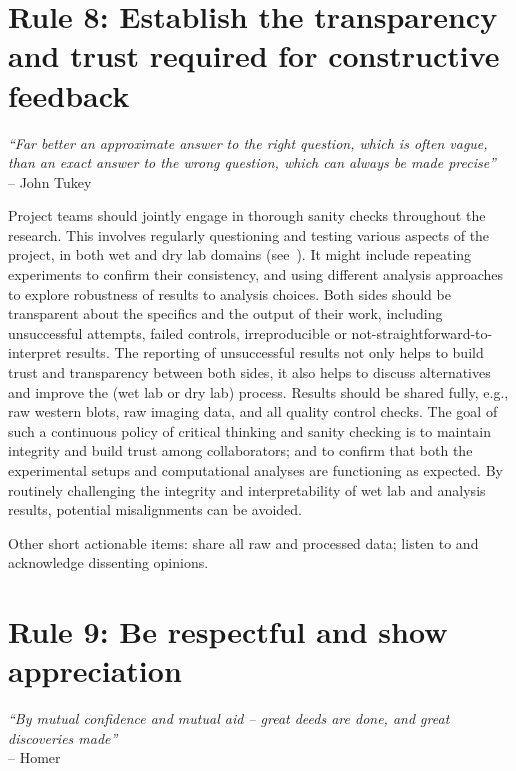 \documentclass{article}
\begin{document}
\section*{Rule 8: Establish the transparency and trust required for constructive feedback} %
\label{rule8_trust}

\begin{flushright}
\rightskip=1cm\textit{``Far better an approximate answer to the right question, which is often vague, than an exact answer to the wrong question, which can always be made precise''} \\
\vspace{.2em}
\rightskip=0cm -- John Tukey
\end{flushright}

Project teams should jointly engage in thorough sanity checks throughout the research. This involves regularly questioning and testing various aspects of the project, in both wet and dry lab domains (see~). It might include repeating experiments to confirm their consistency, and using different analysis approaches to explore robustness of results to analysis choices. Both sides should be transparent about the specifics and the output of their work, including unsuccessful attempts, failed controls, irreproducible or not-straightforward-to-interpret results. The reporting of unsuccessful results not only helps to build trust and transparency between both sides, it also helps to discuss alternatives and improve the (wet lab or dry lab) process. Results should be shared fully, e.g., raw western blots, raw imaging data, and all quality control checks. The goal of such a continuous policy of critical thinking and sanity checking is to maintain integrity and build trust among collaborators; and to confirm that both the experimental setups and computational analyses are functioning as expected. By routinely challenging the integrity and interpretability of wet lab and analysis results, potential misalignments can be avoided.

Other short actionable items: share all raw and processed data; listen to and acknowledge dissenting opinions.

\section*{Rule 9: Be respectful and show appreciation} %
\label{rule9_respect}

\begin{flushright}
\rightskip=1cm\textit{``By mutual confidence and mutual aid – great deeds are done, and great discoveries made''} \\
\vspace{.2em}
\rightskip=0cm -- Homer
\end{flushright}
\end{document}
